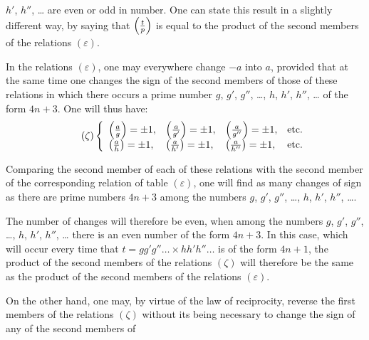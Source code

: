 \par\noindent
$h'$, $h''$, \ldots{} are even or odd in number. One can state this result in a slightly different
way, by saying that $\left(\frac{t}{p}\right)$ is equal to the product of the second members of the relations
$(\varepsilon)$.
\par\indent
In the relations $(\varepsilon)$, one may everywhere change $-a$ into $a$, provided that at the
same time one changes the sign of the second members of those of these relations in which there
occurs a prime number $g$, $g'$, $g''$, \ldots{}, $h$, $h'$, $h''$, \ldots{} of the form $4n+3$.
One will thus have:
\begin{equation*}\tag{$\zeta$}
\left\{
\begin{array}{llll}
\left(\frac{a}{g}\right)=\pm1,& \left(\frac{a}{g'}\right)=\pm1,& \left(\frac{a}{g''}\right)=\pm1,& \text{etc.}\\[0.3em]
\left(\frac{a}{h}\right)=\pm1,& \left(\frac{a}{h'}\right)=\pm1,& \left(\frac{a}{h''}\right)=\pm1,& \text{etc.}
\end{array}
\right.
\end{equation*}
\par\indent
Comparing the second member of each of these relations with the second member of the corresponding
relation of table $(\varepsilon)$, one will find as many changes of sign as there are prime
numbers $4n+3$ among the numbers $g$, $g'$, $g''$, \ldots{}, $h$, $h'$, $h''$, \ldots{}.
\par\indent
The number of changes will therefore be even, when among the numbers $g$, $g'$, $g''$, \ldots{},
$h$, $h'$, $h''$, \ldots{} there is an even number of the form $4n+3$. In this case, which will
occur every time that $t=gg'g''\ldots{}\times hh'h''\ldots$ is of the form $4n+1$, the product of
the second members of the relations $(\zeta)$ will therefore be the same as the product of the
second members of the relations $(\varepsilon)$.
\par\indent
On the other hand, one may, by virtue of the law of reciprocity, reverse the first members of the
relations $(\zeta)$ without its being necessary to change the sign of any of the second members of

